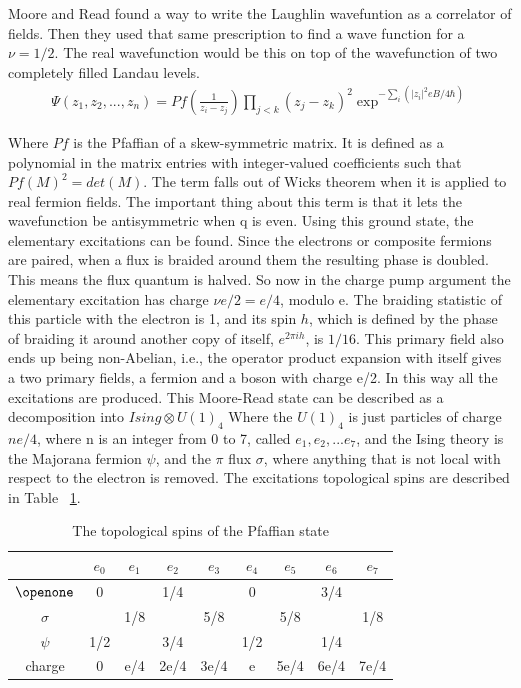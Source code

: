 Moore and Read found a way to write the Laughlin wavefuntion as a correlator of fields. Then they used that same prescription to find a wave function for a $\nu=1/2$. The real wavefunction would be this on top of the wavefunction of two completely filled Landau levels. 
\begin{align}
\Psi(z_1,z_2,...,z_n) = Pf(\frac{1}{z_i-z_j})\prod_{j<k}(z_j-z_k)^2 \exp^{-\sum_i(|z_i|^2eB/4\hbar)}
\end{align}

Where $Pf$ is the Pfaffian of a skew-symmetric matrix. It is defined as a polynomial in the matrix entries with integer-valued coefficients such that $Pf(M)^2=det(M)$. The term falls out of Wicks theorem when it is applied to real fermion fields. The important thing about this term is that it lets the wavefunction be antisymmetric when q is even. Using this ground state, the elementary excitations can be found. Since the electrons or composite fermions are paired, when a flux is braided around them the resulting phase is doubled. This means the flux quantum is halved. So now in the charge pump argument the elementary excitation has charge $\nu e/2 = e/4$, modulo e. The braiding statistic of this particle with the electron is 1, and its spin $h$, which is defined by the phase of braiding it around another copy of itself, $e^{2\pi i h}$, is $1/16$. This primary field also ends up being non-Abelian, i.e., the operator product expansion with itself gives a two primary fields, a fermion and a boson with charge e/2. In this way all the excitations are produced. This Moore-Read state can be described as a decomposition into $Ising \otimes U(1)_4$ Where the $U(1)_4$ is just particles of charge $ne/4$, where n is an integer from 0 to 7, called $e_1,e_2,...e_7$, and the Ising theory is the Majorana fermion $\psi$, and the $\pi$ flux $\sigma$, where anything that is not local with respect to the electron is removed. The excitations topological spins are described in Table ~\ref{tab:Pfaff}.
\begin{table}[h]
	\centering
	\begin{tabular}{|c|c|c|c|c|c|c|c|c|}
		\hline
		&$e_0$& $e_1$ & $e_2$ & $e_3$ & $e_4$& $e_5$& $e_6$& $e_7$\\
		\hline
		$\openone$ & 0 && 1/4 & & 0 && 3/4 & \\
		\hline
		$\sigma $ && 1/8 && 5/8 && 5/8 && 1/8 \\
		\hline
		$\psi$ & 1/2 && 3/4 & & 1/2 && 1/4 &\\
		\hline
		charge & 0 &e/4& 2e/4 & 3e/4 & e & 5e/4& 6e/4 & 7e/4\\
		\hline
	\end{tabular}
	\label{tab:Pfaff}
	\caption{The topological spins of the Pfaffian state}
\end{table}

